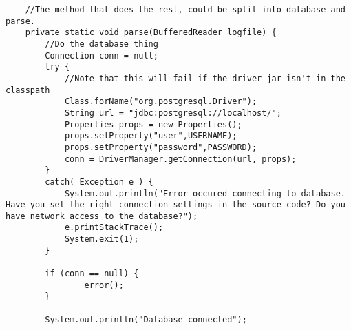 \begin{lstlisting}
    //The method that does the rest, could be split into database and parse.
    private static void parse(BufferedReader logfile) {
        //Do the database thing
        Connection conn = null;
        try {
            //Note that this will fail if the driver jar isn't in the classpath
            Class.forName("org.postgresql.Driver");
            String url = "jdbc:postgresql://localhost/";
            Properties props = new Properties();
            props.setProperty("user",USERNAME);
            props.setProperty("password",PASSWORD);
            conn = DriverManager.getConnection(url, props);
        }
        catch( Exception e ) {
            System.out.println("Error occured connecting to database. Have you set the right connection settings in the source-code? Do you have network access to the database?");
            e.printStackTrace();
            System.exit(1);
        }

        if (conn == null) {
                error();
        }

        System.out.println("Database connected");
	

\end{lstlisting}
